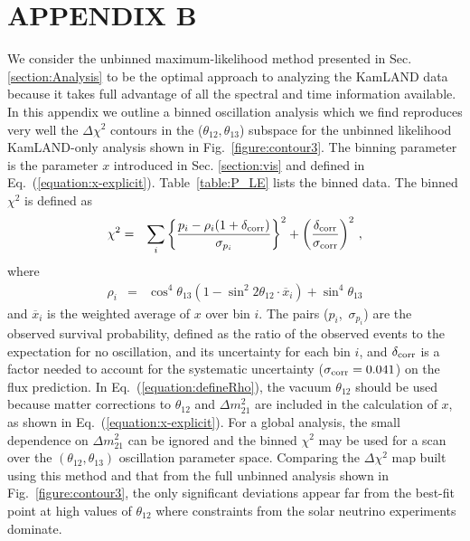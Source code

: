 \documentclass[aps,prc,twocolumn,groupedaddress,showpacs,amsmath,amssymb,floatfix,superscriptaddress]{revtex4}
\begin{document}
\section*{APPENDIX B}
We consider the unbinned maximum-likelihood method presented in Sec. \ref{section:Analysis} to be the optimal approach to analyzing the KamLAND data because it takes full advantage of all the spectral and time information available.   In this appendix we outline a binned oscillation analysis which we find reproduces very well the $\Delta \chi^{2}$ contours in the ($\theta_{12},\theta_{13}$) subspace for the unbinned likelihood KamLAND-only analysis shown in \mbox{Fig. \ref{figure:contour3}}.  The binning parameter is the parameter $x$ introduced in Sec. \ref{section:vis} and defined in \mbox{Eq.~(\ref{equation:x-explicit})}. Table~\ref{table:P_LE} lists the binned data. The binned $\chi^{2}$ is defined as 
 \begin{eqnarray}
 \chi^{2} & = & \sum_{i} \left\{ \frac{p_{i} - \rho_{i}(1 + \delta_{\rm corr})}{ \sigma_{p_{i}}} \right\}^{2} + \left( \frac{\delta_{\rm corr}}{\sigma_{\rm corr}} \right)^{2}\,,
 \end{eqnarray}
\vspace{-0.5cm}
 where
 \begin{eqnarray}
 \rho_{i} & = & \cos^{4}\theta_{13}(1 - \sin^{2}2\theta_{12} \cdot \overline{x} _{i}) + \sin^{4}\theta_{13} \label{equation:defineRho}
 \end{eqnarray}
and $ \overline{x}_{i}$ is the weighted average of $x$ over bin $i$.  The pairs \mbox{($p_{i}$, $\sigma_{p_{i}}$)} are the observed survival probability, defined as the ratio of the observed events to the expectation for no oscillation,  and its uncertainty for each bin $i$, and $\delta_{\rm corr}$ is a factor needed to account for the systematic uncertainty  \mbox{($\sigma_{\rm corr} = 0.041$)} on the flux prediction. In \mbox{Eq.~(\ref{equation:defineRho})}, the vacuum $\theta_{12}$ should be used because matter corrections to $\theta_{12}$ and $\Delta m_{21}^{2}$ are included in the calculation of $x$, as shown in \mbox{Eq.~(\ref{equation:x-explicit})}. For a global analysis, the small dependence on $\Delta m_{21}^{2}$ can be ignored and the binned $\chi^{2}$ may be used for a scan over the  $(\theta_{12}, \theta_{13})$ oscillation parameter space. Comparing the $\Delta \chi^{2}$ map built using this method and that from the full unbinned analysis shown in \mbox{Fig. \ref{figure:contour3}}, the only significant deviations appear far from the best-fit point at high values of $\theta_{12}$ where constraints from the solar neutrino experiments dominate.
 
\end{document}
